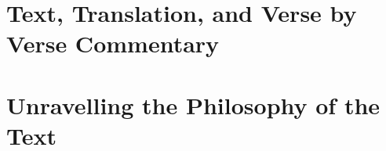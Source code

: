 \documentclass[11pt,twoside,openany]{book}
\begin{document}
\frontmatter

\lhead[\small\thepage]{\small\leftmark}
\chead[]{}
\cfoot[]{}


\newpage
 

\newpage


\newpage


\newpage


\newpage



\tableofcontents

\mainmatter

\part{Text, Translation, and Verse by Verse Commentary}





















\part{Unravelling the Philosophy of the Text}






\end{document}
